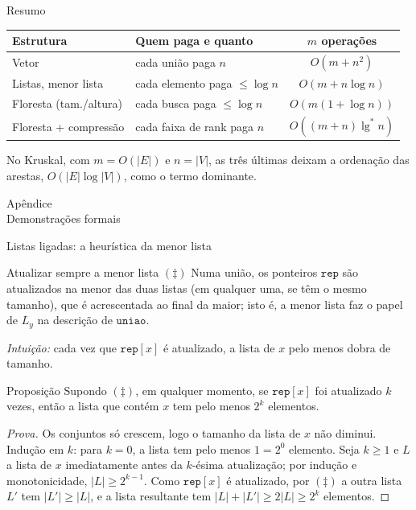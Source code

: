 \documentclass[aspectratio=169,10pt]{beamer}
\newcommand{\Uniao}{\mathtt{uniao}}
\renewcommand{\lg}{\operatorname{lg}}
\newcommand{\lgs}{\lg^{*}}
\begin{document}
\begin{frame}[t]{Resumo}
  \small
  \centering
  \renewcommand{\arraystretch}{1.5}
  \begin{tabular}{|l|l|c|}\hline
    \textbf{Estrutura} & \textbf{Quem paga e quanto} &
    \textbf{$m$ operações} \\ \hline\hline
    Vetor & cada união paga $n$ & $O(m+n^2)$ \\ \hline
    Listas, menor lista & cada elemento paga $\leq\log n$ & $O(m+n\log n)$ \\ \hline
    Floresta (tam./altura) & cada busca paga $\leq\log n$ & $O(m(1+\log n))$ \\ \hline
    Floresta + compressão & cada faixa de rank paga $n$ &
    $O((m+n)\lgs n)$ \\ \hline
  \end{tabular}

  \medskip\normalsize
  No Kruskal, com $m=O(|E|)$ e $n=|V|$, as três últimas deixam a
  ordenação das arestas, $O(|E|\log|V|)$, como o termo dominante.
\end{frame}

\appendix
\begin{frame}[plain]
  \centering\Large
  Apêndice\\[1ex]
  \normalsize Demonstrações formais
\end{frame}

\begin{frame}[t]{Listas ligadas: a heurística da menor lista}
  \small
  \begin{block}{Atualizar sempre a menor lista \hfill $(\ddag)$}
    Numa união, os ponteiros $\mathtt{rep}$ são atualizados na menor das
    duas listas (em qualquer uma, se têm o mesmo tamanho), que é
    acrescentada ao final da maior; isto é, a menor lista faz o papel de
    $L_y$ na descrição de $\Uniao$.
  \end{block}

  \medskip
  \textit{Intuição:} cada vez que $\mathtt{rep}[x]$ é atualizado, a
  lista de $x$ pelo menos dobra de tamanho.

  \begin{block}{Proposição}
    Supondo $(\ddag)$, em qualquer momento, se $\mathtt{rep}[x]$ foi
    atualizado $k$ vezes, então a lista que contém $x$ tem pelo menos
    $2^k$ elementos.
  \end{block}
  \begin{proof}[Prova]
    \footnotesize
    Os conjuntos só crescem, logo o tamanho da lista de $x$ não diminui.
    Indução em $k$: para $k=0$, a lista tem pelo menos $1=2^0$ elemento.
    Seja $k\geq1$ e $L$ a lista de $x$ imediatamente antes da $k$-ésima
    atualização; por indução e monotonicidade, $|L|\geq2^{k-1}$.  Como
    $\mathtt{rep}[x]$ é atualizado, por $(\ddag)$ a outra lista $L'$
    tem $|L'|\geq|L|$, e a lista resultante tem
    $|L|+|L'|\geq2|L|\geq2^k$ elementos.
  \end{proof}
\end{frame}
\end{document}
